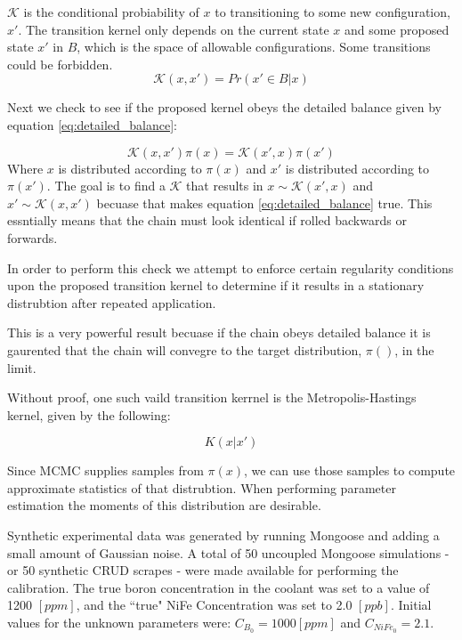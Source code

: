 \documentclass[10pt,a4paper]{report}
\begin{document}
$\mathcal K $  is the conditional probiability of $x$ to transitioning to some new configuration, $x'$.  The transition kernel only depends on the current state $x$ and some proposed state $x'$ in $B$, which is the space of allowable configurations.  Some transitions could be forbidden.  
\begin{equation}
\mathcal K(x,x') = Pr(x' \in B |x)
\end{equation}

Next we check to see if the proposed kernel obeys the detailed balance given by equation \ref{eq:detailed_balance}:

\begin{equation}
\mathcal K(x, x') \pi(x) = \mathcal K(x',x) \pi(x')
\label{eq:detailed_balance}
\end{equation}
Where $x$ is distributed according to $\pi(x)$ and $x'$ is distributed according to $\pi(x')$.  The goal is to find a $\mathcal K$ that results in $x \sim \mathcal K(x',x)$ and  $x' \sim \mathcal K(x,x')$ becuase that makes equation \ref{eq:detailed_balance} true.  This essntially means that the chain must look identical if rolled backwards or forwards. 

In order to perform this check we attempt to enforce certain regularity conditions upon the proposed transition kernel to determine if it results in a stationary distrubtion after repeated application.

This is a very powerful result becuase if the chain obeys detailed balance it is gaurented that the chain will convegre to the target distribution, $\pi()$, in the limit.

Without proof, one such vaild transition kerrnel is the Metropolis-Hastings kernel, given by the following:

\begin{equation}
K(x|x')
\end{equation}

Since MCMC supplies samples from $\pi(x)$, we can use those samples to compute approximate statistics of that distrubtion.  When performing parameter estimation the moments of this distribution are desirable.

Synthetic experimental data was generated by running Mongoose and adding a small amount of Gaussian noise.  A total of 50 uncoupled Mongoose simulations - or 50 synthetic CRUD scrapes - were made available for performing the calibration.  The true boron concentration in the coolant was set to a value of 1200 $[ppm]$, and the ``true" NiFe Concentration was set to 2.0 $[ppb]$. Initial values for the unknown parameters were: $C_{B_0} = 1000 [ppm]$ and $C_{NiFe_0} = 2.1$.
\end{document}
